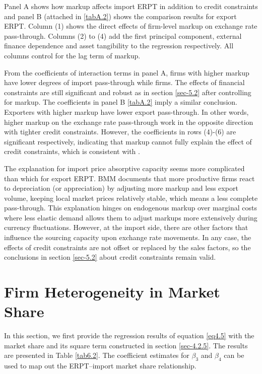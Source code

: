 Panel A shows how markup affects import ERPT in addition to credit constraints and panel B (attached in \ref{tabA.2}) shows the comparison results for export ERPT. Column (1) shows the direct effects of firm-level markup on exchange rate pass-through. Columns (2) to (4) add the first principal component, external finance dependence and asset tangibility to the regression respectively. All columns control for the lag term of markup.

From the coefficients of interaction terms in panel A, firms with higher markup have lower degrees of import pass-through while firms. The effects of financial constraints are still significant and robust as in section \ref{sec-5.2} after controlling for markup. The coefficients in panel B \ref{tabA.2} imply a similar conclusion. Exporters with higher markup have lower export pass-through. In other words, higher markup on the exchange rate pass-through work in the opposite direction with tighter credit constraints. However, the coefficients in rows (4)-(6) are significant respectively, indicating that markup cannot fully explain the effect of credit constraints, which is consistent with \cite{xu-guo2021}.

The explanation for import price absorptive capacity seems more complicated than which for export ERPT. BMM\cite{bmm2012} documents that more productive firms react to depreciation (or appreciation) by adjusting more markup and less export volume, keeping local market prices relatively stable, which means a less complete pass-through. This explanation hinges on endogenous markup over marginal costs where less elastic demand allows them to adjust markups more extensively during currency fluctuations. However, at the import side, there are other factors that influence the sourcing capacity upon exchange rate movements. In any case, the effects of credit constraints are not offset or replaced by the sales factors, so the conclusions in section \ref{sec-5.2} about credit constraints remain valid.

\section{Firm Heterogeneity in Market Share}

In this section, we first provide the regression results of equation \ref{eq4.5} with the market share and its square term constructed in section \ref{sec-4.2.5}. The results are presented in Table \ref{tab6.2}. The coefficient estimates for $\beta_3$ and $\beta_4$ can be used to map out the ERPT–import market share relationship.

